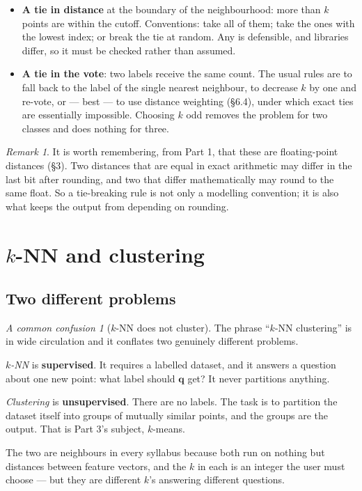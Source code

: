 \documentclass[11pt]{article}
\theoremstyle{plain}
\theoremstyle{definition}
\theoremstyle{remark}
\newtheorem*{rmk}{Remark}
\newtheorem*{warn}{A common confusion}
\newcommand{\vc}[1]{\mathbf{#1}}
\begin{document}
\begin{itemize}[leftmargin=1.4em,itemsep=4pt]
  \item \textbf{A tie in distance} at the boundary of the neighbourhood: more
        than $k$ points are within the cutoff. Conventions: take all of them;
        take the ones with the lowest index; or break the tie at random. Any is
        defensible, and libraries differ, so it must be checked rather than
        assumed.
  \item \textbf{A tie in the vote}: two labels receive the same count. The usual
        rules are to fall back to the label of the single nearest neighbour, to
        decrease $k$ by one and re-vote, or --- best --- to use distance
        weighting (\S6.4), under which exact ties are essentially impossible.
        Choosing $k$ odd removes the problem for two classes and does nothing
        for three.
\end{itemize}

\begin{rmk}
It is worth remembering, from Part 1, that these are floating-point distances
(\S3). Two distances that are equal in exact arithmetic may differ in the last
bit after rounding, and two that differ mathematically may round to the same
float. So a tie-breaking rule is not only a modelling convention; it is also
what keeps the output from depending on rounding.
\end{rmk}

\section{\texorpdfstring{$k$}{k}-NN and clustering}
\subsection{Two different problems}
\begin{warn}[$k$-NN does not cluster]
The phrase ``$k$-NN clustering'' is in wide circulation and it conflates two
genuinely different problems.

\emph{$k$-NN} is \textbf{supervised}. It requires a labelled dataset, and it
answers a question about one new point: what label should $\vc{q}$ get? It never
partitions anything.

\emph{Clustering} is \textbf{unsupervised}. There are no labels. The task is to
partition the dataset itself into groups of mutually similar points, and the
groups are the output. That is Part 3's subject, $k$-means.

The two are neighbours in every syllabus because both run on nothing but
distances between feature vectors, and the $k$ in each is an integer the user
must choose --- but they are different $k$'s answering different questions.
\end{warn}
\end{document}
